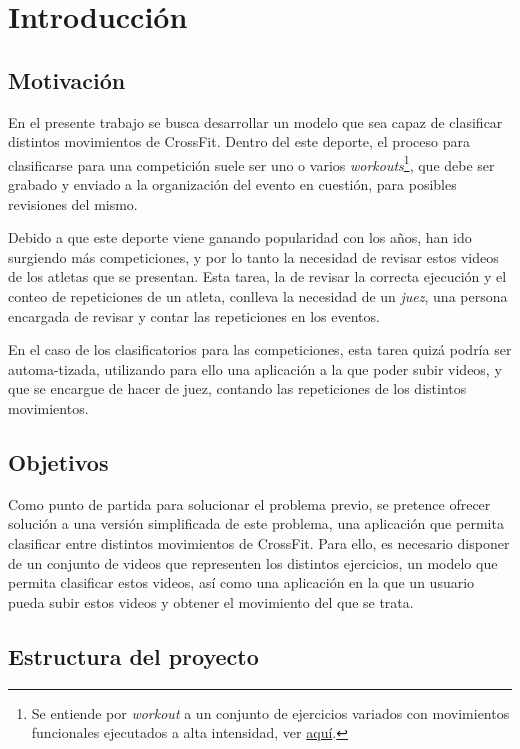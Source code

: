 \chapter{Introducción}


\section{Motivación}

En el presente trabajo se busca desarrollar un modelo que sea capaz de clasificar distintos movimientos de CrossFit. Dentro del este deporte, el proceso para clasificarse para una competición suele ser uno o varios \textit{workouts}\footnote{Se entiende por \textit{workout} a un conjunto de ejercicios variados con movimientos funcionales ejecutados a alta intensidad, ver \href{https://www.crossfit.com/what-is-crossfit}{aquí}.}, que debe ser grabado y enviado a la organización del evento en cuestión, para posibles revisiones del mismo.

Debido a que este deporte viene ganando popularidad con los años, han ido surgiendo más competiciones, y por lo tanto la necesidad de revisar estos videos de los atletas que se presentan. Esta tarea, la de revisar la correcta ejecución y el conteo de repeticiones de un atleta, conlleva la necesidad de un \textit{juez}, una persona encargada de revisar y contar las repeticiones en los eventos.

En el caso de los clasificatorios para las competiciones, esta tarea quizá podría ser automa-tizada, utilizando para ello una aplicación a la que poder subir videos, y que se encargue de hacer de juez, contando las repeticiones de los distintos movimientos.

\section{Objetivos}

Como punto de partida para solucionar el problema previo, se pretence ofrecer solución a una versión simplificada de este problema, una aplicación que permita clasificar entre distintos movimientos de CrossFit. Para ello, es necesario disponer de un conjunto de videos que representen los distintos ejercicios, un modelo que permita clasificar estos videos, así como una aplicación en la que un usuario pueda subir estos videos y obtener el movimiento del que se trata.

\section{Estructura del proyecto}


